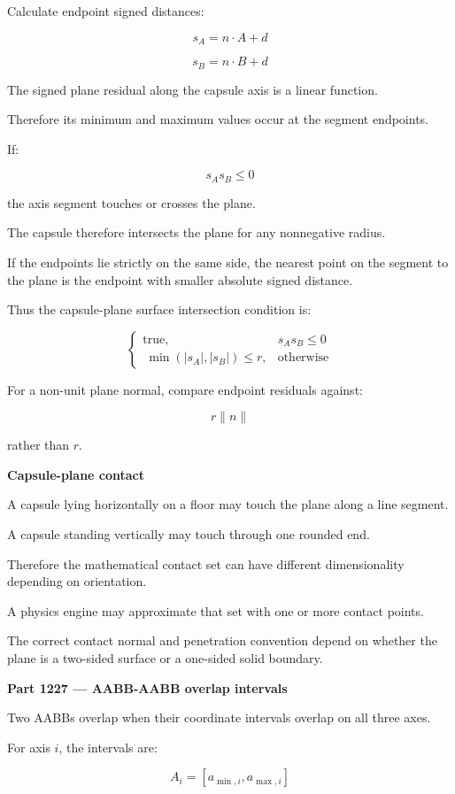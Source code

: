 Calculate endpoint signed distances:

\[
s_A=n\cdot A+d
\]

\[
s_B=n\cdot B+d
\]

The signed plane residual along the capsule axis is a linear function.

Therefore its minimum and maximum values occur at the segment endpoints.

If:

\[
s_As_B\le0
\]

the axis segment touches or crosses the plane.

The capsule therefore intersects the plane for any nonnegative radius.

If the endpoints lie strictly on the same side, the nearest point on the segment to the plane is the endpoint with smaller absolute signed distance.

Thus the capsule-plane surface intersection condition is:

\[
\boxed{ \begin{cases} \text{true},&s_As_B\le0\\\ \min(|s_A|,|s_B|)\le r,&\text{otherwise} \end{cases} }
\]

For a non-unit plane normal, compare endpoint residuals against:

\[
r\|n\|
\]

rather than \(r\).

\textbf{Capsule-plane contact}

A capsule lying horizontally on a floor may touch the plane along a line segment.

A capsule standing vertically may touch through one rounded end.

Therefore the mathematical contact set can have different dimensionality depending on orientation.

A physics engine may approximate that set with one or more contact points.

The correct contact normal and penetration convention depend on whether the plane is a two-sided surface or a one-sided solid boundary.

\textbf{Part 1227 --- AABB-AABB overlap intervals}

Two AABBs overlap when their coordinate intervals overlap on all three axes.

For axis \(i\), the intervals are:

\[
A_i=[a_{\min,i},a_{\max,i}]
\]

